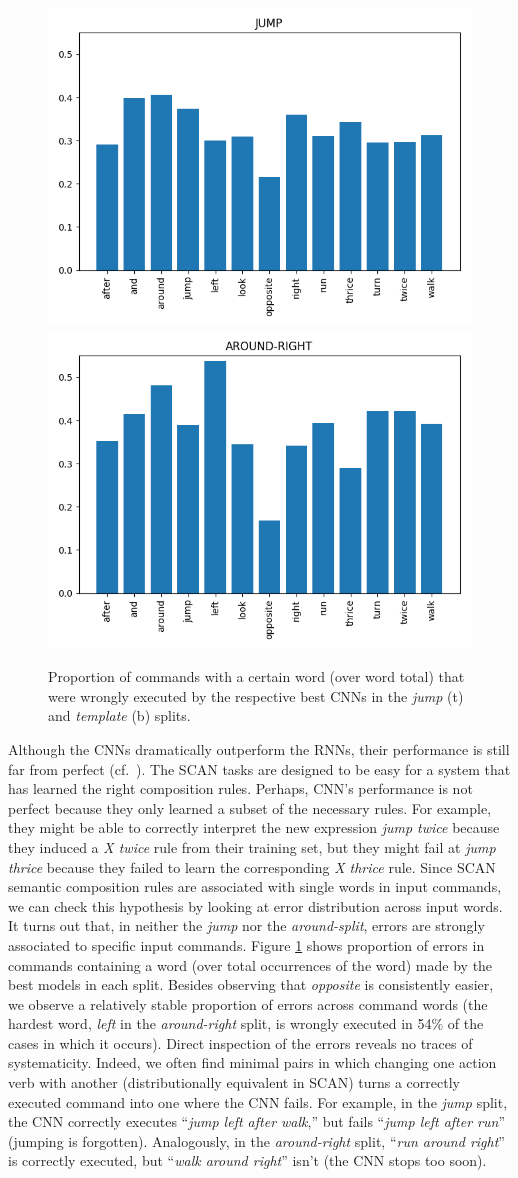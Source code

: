 \begin{figure}[h]
    \centering
    \includegraphics[width=.4\textwidth,keepaspectratio]{figures/jump_error_dist.png}
    \includegraphics[width=.4\textwidth,keepaspectratio]{figures/template_error_dist.png}
    \caption{Proportion of commands with a certain word (over word
      total) that were wrongly executed by the respective best CNNs in
      the \emph{jump} (t) and \emph{template} (b) splits.}
    \label{fig:error_distributions}
\end{figure}


Although the CNNs dramatically outperform the RNNs, their performance
is still far from perfect (cf.~\label{table:main results}). The SCAN
tasks are designed to be easy for a system that has learned the right
composition rules. Perhaps, CNN's performance is not perfect because
they only learned a subset of the necessary rules. For example, they
might be able to correctly interpret the new expression \emph{jump
  twice} because they induced a \emph{X twice} rule from their
training set, but they might fail at \emph{jump thrice} because they
failed to learn the corresponding \emph{X thrice} rule. Since SCAN
semantic composition rules are associated with single words in input
commands, we can check this hypothesis by looking at error
distribution across input words. It turns out that, in neither the
\emph{jump} nor the \emph{around-split}, errors are strongly
associated to specific input commands. Figure
\ref{fig:error_distributions} shows proportion of errors in commands
containing a word (over total occurrences of the word) made by the
best models in each split. Besides observing that \emph{opposite} is
consistently easier, we observe a relatively stable proportion of
errors across command words (the hardest word, \emph{left} in the
\emph{around-right} split, is wrongly executed in 54\% of the cases in
which it occurs). Direct inspection of the errors reveals no traces of
systematicity. Indeed, we often find minimal pairs in which changing
one action verb with another (distributionally equivalent in SCAN)
turns a correctly executed command into one where the CNN fails. For
example, in the \emph{jump} split, the CNN correctly executes
``\emph{jump left after walk},'' but fails ``\emph{jump
  left after run}'' (jumping is forgotten). Analogously, in the
\emph{around-right} split, ``\emph{run around right}'' is correctly
executed, but ``\emph{walk around right}'' isn't (the CNN stops too
soon).
